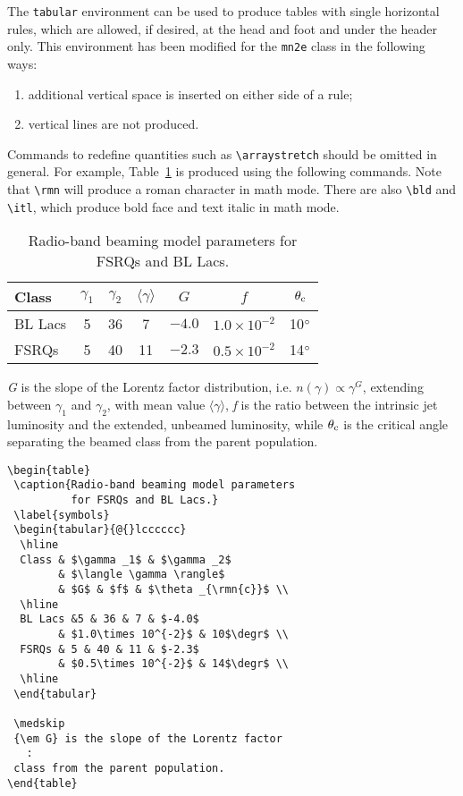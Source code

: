 \documentclass[useAMS,usenatbib]{mn2e}
\begin{document}
The \verb"tabular" environment can be used to produce tables with
single horizontal rules, which are allowed, if desired, at the
head and foot and under the header only. This environment has been
modified for the {\tt mn2e} class in the following ways:
%
\begin{enumerate}
  \item additional vertical space is inserted on either side of a rule;
  \item vertical lines are not produced.
\end{enumerate}
%
Commands to redefine quantities such as \verb"\arraystretch"
should be omitted in general. For example, Table~\ref{symbols} is
produced using the following commands. Note that \verb"\rmn" will
produce a roman character in math mode. There are also \verb"\bld"
and \verb"\itl", which produce bold face and text italic in math
mode.
\begin{table}
 \caption{Radio-band beaming model parameters
          for FSRQs and BL Lacs.}
 \label{symbols}
 \begin{tabular}{@{}lcccccc}
  \hline
  Class & $\gamma _1$ & $\gamma _2$
        & $\langle \gamma \rangle$
        & $G$ & $f$ & $\theta _{{\mathrm{c}}}$ \\
  \hline
  BL Lacs &5 & 36 & 7 & $-4.0$
        & $1.0\times 10^{-2}$ & 10$\hbox{$^\circ$}$ \\
  FSRQs & 5 & 40 & 11 & $-2.3$
        & $0.5\times 10^{-2}$ & 14$\hbox{$^\circ$}$ \\
  \hline
 \end{tabular}

 \medskip
 {\em G} is the slope of the Lorentz factor distribution, i.e.
 $n(\gamma)\propto \gamma ^G$, extending between $\gamma _1$ and
 $\gamma_2$, with mean value $\langle \gamma \rangle$, {\em f\/} is the
 ratio between the intrinsic jet luminosity and the extended, unbeamed
 luminosity, while $\theta_{{\mathrm{c}}}$ is the critical angle separating
 the beamed class from the parent population.
\end{table}
\begin{verbatim}
\begin{table}
 \caption{Radio-band beaming model parameters
          for FSRQs and BL Lacs.}
 \label{symbols}
 \begin{tabular}{@{}lcccccc}
  \hline
  Class & $\gamma _1$ & $\gamma _2$
        & $\langle \gamma \rangle$
        & $G$ & $f$ & $\theta _{\rmn{c}}$ \\
  \hline
  BL Lacs &5 & 36 & 7 & $-4.0$
        & $1.0\times 10^{-2}$ & 10$\degr$ \\
  FSRQs & 5 & 40 & 11 & $-2.3$
        & $0.5\times 10^{-2}$ & 14$\degr$ \\
  \hline
 \end{tabular}

 \medskip
 {\em G} is the slope of the Lorentz factor
   :
 class from the parent population.
\end{table}
\end{verbatim}
\end{document}

